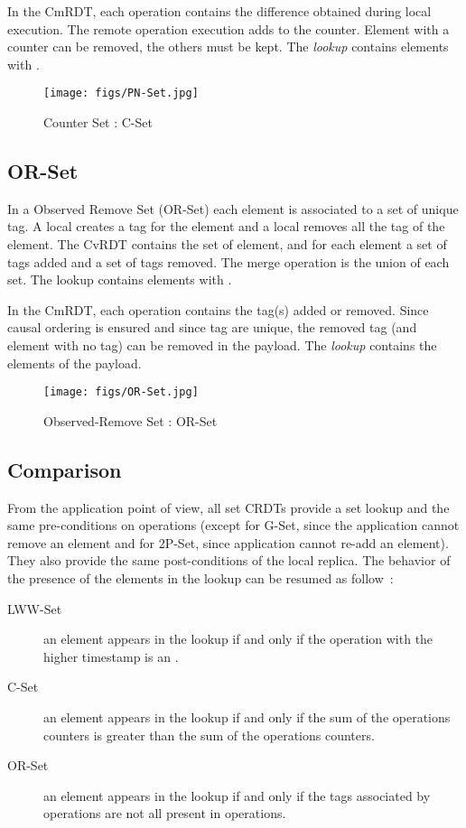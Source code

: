 \documentclass[a4paper]{article}
\begin{document}
In the CmRDT, each operation contains the difference  obtained
during local execution. The remote operation execution adds 
to the counter. Element with a counter  can be removed, the
others must be kept. The {\em lookup} contains elements with .

\begin{figure}[H] 
\centering
\texttt{[image: figs/PN-Set.jpg]} 
\caption{Counter Set : C-Set~\cite{shapiro11comprehensive}}
\label{fig:PN} 
\end{figure} 


\subsection{OR-Set}

In a Observed Remove Set (OR-Set) each element is associated to a set
of unique tag. A local  creates a tag for the element and a local
 removes all the tag of the element. The CvRDT contains the set of
element, and for each element a set  of tags added and a set  of
tags removed. The merge operation is the union of each set. The lookup
contains elements with .

In the CmRDT, each operation contains the tag(s) added or
removed. Since causal ordering is ensured and since tag are unique,
the removed tag (and element with no tag) can be removed in the
payload. The {\em lookup} contains the elements of the payload.


\begin{figure}[H] 
\centering
\texttt{[image: figs/OR-Set.jpg]} 
\caption{Observed-Remove Set : OR-Set~\cite{shapiro11comprehensive}}
\label{fig:OR} 
\end{figure} 

\subsection{Comparison}

From the application point of view, all set CRDTs provide a set lookup
and the same pre-conditions on operations (except for G-Set, since the
application cannot remove an element and for 2P-Set, since application
cannot re-add an element). They also provide the same post-conditions
of the local replica. The behavior of the presence of the elements in
the lookup can be resumed as follow~:
\begin{description}
\item[LWW-Set] an element appears in the lookup if and only if the
  operation with the higher timestamp is an .
\item[C-Set] an element appears in the lookup if and only if the
  sum of the  operations counters is greater than the sum of the
   operations counters.
\item[OR-Set] an element appears in the lookup if and only if the
  tags associated by  operations are not all present in 
  operations.
\end{description}
\end{document}
